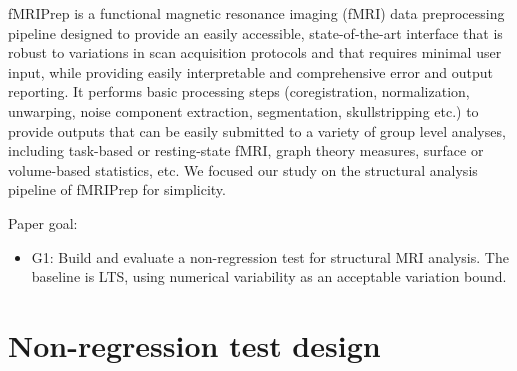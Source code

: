 \documentclass{article}
\begin{document}
fMRIPrep is a functional magnetic resonance imaging (fMRI) data preprocessing
pipeline designed to provide an easily accessible, state-of-the-art interface
that is robust to variations in scan acquisition protocols and that requires
minimal user input, while providing easily interpretable and comprehensive error
and output reporting. It performs basic processing steps (coregistration,
normalization, unwarping, noise component extraction, segmentation,
skullstripping etc.) to provide outputs that can be easily submitted to a
variety of group level analyses, including task-based or resting-state fMRI,
graph theory measures, surface or volume-based statistics, etc. We focused our
study on the structural analysis pipeline of fMRIPrep for simplicity.




Paper goal:
\begin{itemize}
    \item G1: Build and evaluate a non-regression test for structural MRI
          analysis. The baseline is LTS, using numerical variability as an acceptable
          variation bound.
\end{itemize}



\section{Non-regression test design}

\end{document}
